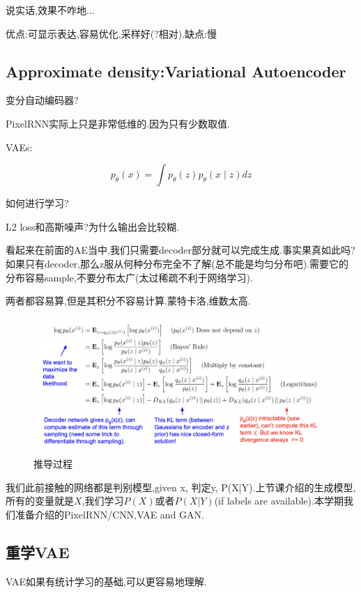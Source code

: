 	说实话,效果不咋地...
	
	优点:可显示表达,容易优化,采样好(?相对).缺点:慢
	
	\subsection{Approximate density:Variational Autoencoder}
	变分自动编码器?
	
	PixelRNN实际上只是非常低维的.因为只有少数取值.
	
	VAEs:
	
	\begin{equation}
		p_{\theta}(x)=\int p_{\theta}(z) p_{\theta}(x \mid z) d z
	\end{equation}
	
	如何进行学习?
	
	L2 loss和高斯噪声?为什么输出会比较糊.
	
	看起来在前面的AE当中,我们只需要decoder部分就可以完成生成.事实果真如此吗?如果只有decoder,那么z服从何种分布完全不了解(总不能是均匀分布吧).需要它的分布容易sample,不要分布太广(太过稀疏不利于网络学习).
	
	两者都容易算,但是其积分不容易计算.蒙特卡洛,维数太高.
	
	\begin{figure}[htbp]
		\centering
		\includegraphics[scale=0.65]{figures/VAE.png}
		\caption{推导过程}
		\label{}
	\end{figure}

	
	我们此前接触的网络都是判别模型,given x, 判定y, P(X|Y).上节课介绍的生成模型,所有的变量就是$X$,我们学习$P(X)$或者$P(X|Y)$(if labels are available).本学期我们准备介绍的PixelRNN/CNN,VAE and GAN.
	
	\subsection{重学VAE}
	VAE如果有统计学习的基础,可以更容易地理解.\marginpar{\kaishu }
	
